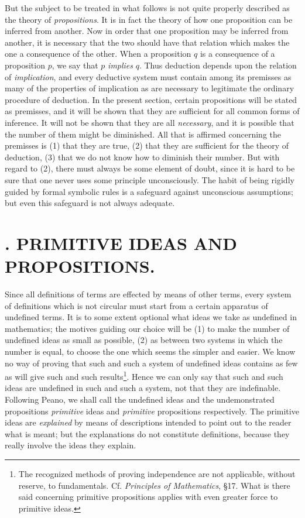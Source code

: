 \documentclass[letterpaper,12pt,openany,leqno]{book}
\newcommand{\pagefirst}[1]{\marginnote[\boxed{\text{#1}}]{\boxed{\text{#1}}}}
\begin{document}
But the subject to be treated in what follows is not quite properly described as the theory of \textit{propositions}. It is in fact the theory of how one proposition can be inferred from another. Now in order that one proposition may be inferred from another, it is necessary that the two should have that relation which makes the one a consequence of the other. When a proposition $q$ is a consequence of a proposition $p$, we say that $p$ \textit{implies} $q$. Thus deduction depends upon the relation of \textit{implication}, and every deductive system must contain among its premisses as many of the properties of implication as are necessary to legitimate the ordinary procedure of deduction. In the present section, certain propositions will be stated as premisses, and it will be shown that they are sufficient for all common forms of inference. It will not be shown that they are all \textit{necessary}, and it is possible that the number of them might be diminished. All that is affirmed concerning the premisses is (1) that they are true, (2) that they are sufficient for the theory of deduction, (3) that we do not know how to diminish their number. But with regard to (2), there must always be some element of doubt, since it is hard to be sure that one never uses some principle unconsciously. The habit of being rigidly guided by formal symbolic rules is a safeguard against unconscious assumptions; but even this safeguard is not always adequate.

\chapter*{\centering {}. PRIMITIVE IDEAS AND PROPOSITIONS.}  \pagefirst{95} 

Since all definitions of terms are effected by means of other terms, every system of definitions which is not circular must start from a certain apparatus of undefined terms. It is to some extent optional what ideas we take as undefined in mathematics; the motives guiding our choice will be (1) to make the number of undefined ideas as small as possible, (2) as between two systems in which the number is equal, to choose the one which seems the simpler and easier. We know no way of proving that such and such a system of undefined ideas contains as few as will give such and such results\footnote{The recognized methods of proving independence are not applicable, without reserve, to fundamentals. Cf. \textit{Principles of Mathematics}, \S17. What is there said concerning primitive propositions applies with even greater force to primitive ideas.}. Hence we can only say that such and such ideas are undefined in such and such a system, not that they are indefinable. Following Peano, we shall call the undefined ideas and the undemonstrated propositions \textit{primitive} ideas and \textit{primitive} propositions respectively. The primitive ideas are \textit{explained} by means of descriptions intended to point out to the reader what is meant; but the explanations do not constitute definitions, because they really involve the ideas they explain.
\end{document}
